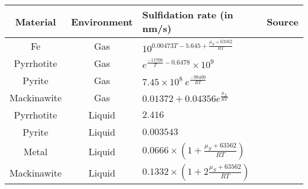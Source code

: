 \documentclass{article}
\begin{document}
\begin{center}
    \begin{tabular}{ | c | c | p{8cm} | c |}
    \hline
    Material & Environment & Sulfidation rate (in nm/s) & Source \\

    \hline
    Fe & Gas & $ 10^{0.00473 T - 5.645 + \frac{\mu_S+63562}{R T}}   $ & \cite{ACPPRJ04} \\

    \hline
    Pyrrhotite & Gas & $e^{\frac{-11766}{T} - 0.6478} \times 10^{9}$ & \cite{MGISFH15} \\

    \hline
    Pyrite & Gas & $7.45 \times 10^8 \ e^{\frac{-98400}{R T}}$ & \cite{KOGSRP03} \\

    \hline
    Mackinawite & Gas & $0.01372 + 0.04356 e^{\frac{\mu_S}{R T}}$ & \cite{COAETR90} \\

    \hline
    Pyrrhotite & Liquid & $2.416$ & \cite{COAETR90} \\

    \hline
    Pyrite & Liquid & $0.003543$ & \cite{CGOCNH98} \\

    \hline
    Metal & Liquid & $0.0666 \times \left(1 + \frac{\mu_S+63562}{R T}\right)$ & \cite{KOHCWS06} \\

    \hline
    Mackinawite & Liquid & $0.1332 \times \left(1 + 2 \frac{\mu_S+63562}{R T}\right)$ & \cite{MMMSWS07} \\

    \hline

    \end{tabular}
\end{center}







\end{document}
